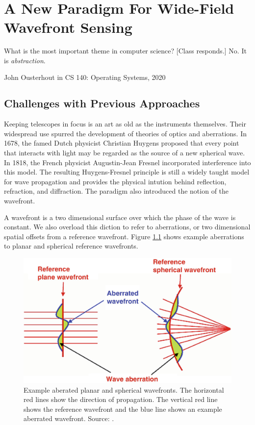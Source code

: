 \chapter{A New Paradigm For Wide-Field Wavefront Sensing}
\label{chap:new_paradigm}

\epigraph{What is the most important theme in computer science? [Class responds.] No. It is \textit{abstraction}.}{John Ousterhout in CS 140: Operating Systems, 2020}

\section{Challenges with Previous Approaches}

Keeping telescopes in focus is an art as old as the instruments themselves. Their widespread use spurred the development of theories of optics and aberrations. In 1678, the famed Dutch physicist Christian Huygens proposed that every point that interacts with light may be regarded as the source of a new spherical wave. In 1818, the French physicist Augustin-Jean Fresnel incorporated interference into this model. The resulting Huygens-Fresnel principle is still a widely taught model for wave propagation and provides the physical intution behind reflection, refraction, and diffraction. The paradigm also introduced the notion of the wavefront.

A wavefront is a two dimensional surface over which the phase of the wave is constant. We also overload this diction to refer to aberrations, or two dimensional spatial offsets from a reference wavefront. Figure \ref{fig:wavefront} shows example aberrations to planar and spherical reference wavefronts. 

\begin{figure}[hbt!]
\centering
\includegraphics[width=14cm, keepaspectratio]{figs/new_paradigm/wavefront.png}
\caption[Wavefront and Wavefront Aberrations]{Example aberated planar and spherical wavefronts. The horizontal red lines show the direction of propagation. The vertical red line shows the reference wavefront and the blue line shows an example aberrated wavefront. Source: \cite{wavefront_fig}. }
\label{fig:wavefront}
\end{figure}

